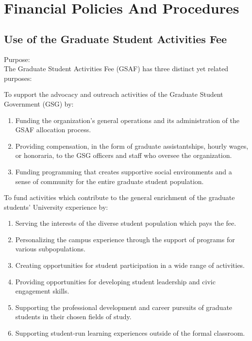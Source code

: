 \chapter{Financial Policies And Procedures}
\label{finance}

\section{Use of the Graduate Student Activities Fee}
\begin{bylaws-number}
  \item Purpose: \hfill \\
  The Graduate Student Activities Fee (GSAF) has three distinct yet related purposes:
  \begin{bylaws-number}
    \item To support the advocacy and outreach activities of the Graduate Student Government (GSG) by:
    \begin{enumerate}[i]
      \item Funding the organization’s general operations and its administration of the GSAF allocation process.
      \item Providing compensation, in the form of graduate assistantships, hourly wages, or honoraria, to the GSG officers and staff who oversee the organization.
      \item Funding programming that creates supportive social environments and a sense of community for the entire graduate student population.
    \end{enumerate}
    \item To fund activities which contribute to the general enrichment of the graduate students’ University experience by:
    \begin{enumerate}[i]
      \item Serving the interests of the diverse student population which pays the fee.
      \item Personalizing the campus experience through the support of programs for various subpopulations.
      \item Creating opportunities for student participation in a wide range of activities.
      \item Providing opportunities for developing student leadership and civic engagement skills.
      \item Supporting the professional development and career pursuits of graduate students in their chosen fields of study.
      \item Supporting student-run learning experiences outside of the formal classroom.

\end{enumerate}
\end{bylaws-number}
\end{bylaws-number}

